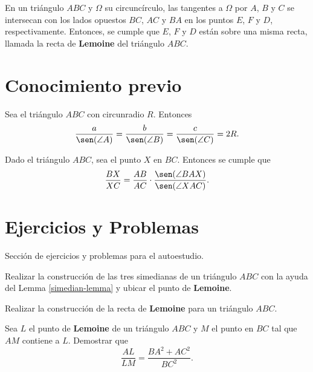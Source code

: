 \begin{section-definition.tcb}
    En un triángulo $ABC$ y $\Omega$ su circuncírculo, las tangentes a $\Omega$ por $A$, $B$ y $C$ se intersecan con los lados opuestos $BC$, $AC$ y $BA$ en los puntos $E$, $F$ y $D$, respectivamente.
    Entonces, se cumple que $E$, $F$ y $D$ están sobre una misma recta, llamada la recta de \textbf{Lemoine} del triángulo $ABC$.
\end{section-definition.tcb}




\section{Conocimiento previo}

\begin{section-theorem.tcb}
    Sea el triángulo $ABC$ con circunradio $R$.
    Entonces
    \[
        \frac{a}{\sen(\angle A)} = \frac{b}{\sen(\angle B)} = \frac{c}{\sen(\angle C)} = 2R.
    \]
\end{section-theorem.tcb}

\begin{section-theorem.tcb}\label{ratio-lemma}
    Dado el triángulo $ABC$, sea el punto $X$ en $BC$.
    Entonces se cumple que
    \[
        \frac{BX}{XC} = \frac{AB}{AC} \cdot \frac{\sen(\angle BAX)}{\sen(\angle XAC)}.
    \]
\end{section-theorem.tcb}




\section{Ejercicios y Problemas}
Sección de ejercicios y problemas para el autoestudio.

\begin{section-exercise}
    Realizar la construcción de las tres simedianas de un triángulo $ABC$ con la ayuda del Lemma \ref{simedian-lemma} y ubicar el punto de \textbf{Lemoine}.
\end{section-exercise}

\begin{section-exercise}
    Realizar la construcción de la recta de \textbf{Lemoine} para un triángulo $ABC$.
\end{section-exercise}

\begin{section-problem}
    Sea $L$ el punto de \textbf{Lemoine} de un triángulo $ABC$ y $M$ el punto en $BC$ tal que $AM$ contiene a $L$.
    Demostrar que
    \[
        \frac{AL}{LM} = \frac{BA^2 + AC^2}{BC^2}.
    \]
\end{section-problem}

